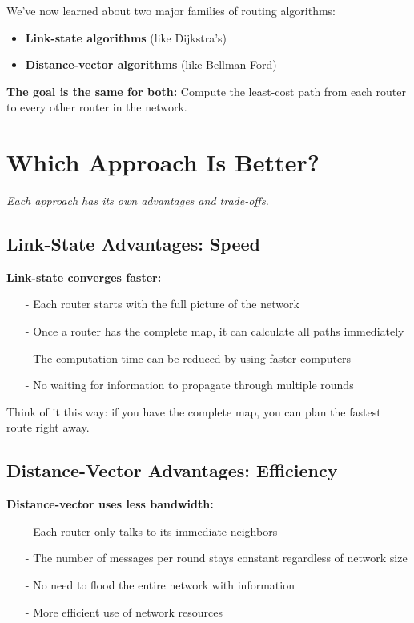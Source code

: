 \documentclass[../../compsys.tex]{subfiles}
\begin{document}
We've now learned about two major families of routing algorithms:
\begin{itemize}
    \item \textbf{Link-state algorithms} (like Dijkstra's)
    \item \textbf{Distance-vector algorithms} (like Bellman-Ford)
\end{itemize}

\textbf{The goal is the same for both:} Compute the least-cost path from each router to every other router in the network.


\section{Which Approach Is Better?}
\textit{Each approach has its own advantages and trade-offs.}

\subsection{Link-State Advantages: Speed}
\textbf{Link-state converges faster:}
\begin{itemize}
    \item[-] Each router starts with the full picture of the network
    \item[-] Once a router has the complete map, it can calculate all paths immediately
    \item[-] The computation time can be reduced by using faster computers
    \item[-] No waiting for information to propagate through multiple rounds
\end{itemize}

Think of it this way: if you have the complete map, you can plan the fastest route right away.

\subsection{Distance-Vector Advantages: Efficiency}
\textbf{Distance-vector uses less bandwidth:}
\begin{itemize}
    \item[-] Each router only talks to its immediate neighbors
    \item[-] The number of messages per round stays constant regardless of network size
    \item[-] No need to flood the entire network with information
    \item[-] More efficient use of network resources
\end{itemize}
\end{document}
